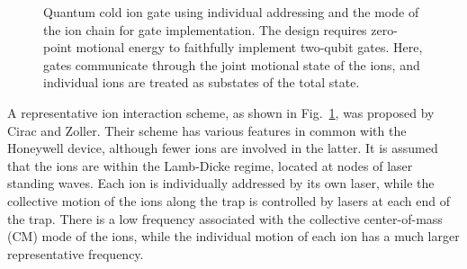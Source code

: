 \documentclass[12pt,a4paper]{amsart}
\numberwithin{equation}{section}
\theoremstyle{plain}
\theoremstyle{definition}
\begin{document}
\begin{figure}
{}
    \caption{Quantum cold ion gate using individual addressing and the mode of the ion chain for gate implementation. \cite{fundQuanIoni} The design requires zero-point motional energy to faithfully implement two-qubit gates. Here, gates communicate through the joint motional state of the ions, and individual ions are treated as substates of the total state.}
        \label{fig:fundQuanIoni1}
\end{figure}


A representative ion interaction scheme, as shown in Fig.~\ref{fig:fundQuanIoni1}, was proposed by Cirac and Zoller. \cite{fundQuanIoni} Their scheme has various features in common with the Honeywell device, although fewer ions are involved in the latter. It is assumed that the ions are within the Lamb-Dicke regime, located at nodes of laser standing waves. Each ion is individually addressed by its own laser, while the collective motion of the ions along the trap is controlled by lasers at each end of the trap. There is a low frequency associated with the collective center-of-mass (CM) mode of the ions, while the individual motion of each ion has a much larger representative frequency.


\end{document}
